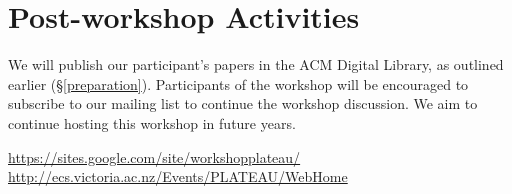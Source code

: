 \documentclass{sigplanconf}
\begin{document}
\section{Post-workshop Activities}

We will publish our participant's papers in the ACM Digital Library, as outlined earlier (\S \ref{preparation}). Participants of the workshop will be encouraged to subscribe to our mailing list to continue the workshop discussion. We aim to continue hosting this workshop in future years.

\begin{thebibliography}{1}
 \url{https://sites.google.com/site/workshopplateau/}
\url{http://ecs.victoria.ac.nz/Events/PLATEAU/WebHome}
\end{thebibliography}
\end{document}
